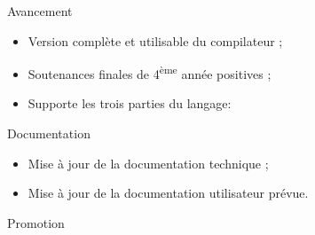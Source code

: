 \documentclass{beamer}
\begin{document}
\begin{frame}[fragile]{Avancement}

\large{
\begin{itemize}
\item Version complète et utilisable du compilateur ;
\item Soutenances finales de 4\textsuperscript{ème} année positives ;
\item Supporte les trois parties du langage:
\end{itemize}
}

\begin{center}
\end{center}
\end{frame}

\begin{frame}{Documentation}
\large{
\begin{itemize}
\item Mise à jour de la documentation technique ;
\item Mise à jour de la documentation utilisateur prévue.
\end{itemize}
}
\end{frame}

\begin{frame}[fragile]{Promotion}
\begin{center}
\end{center}
\end{frame}
\end{document}
